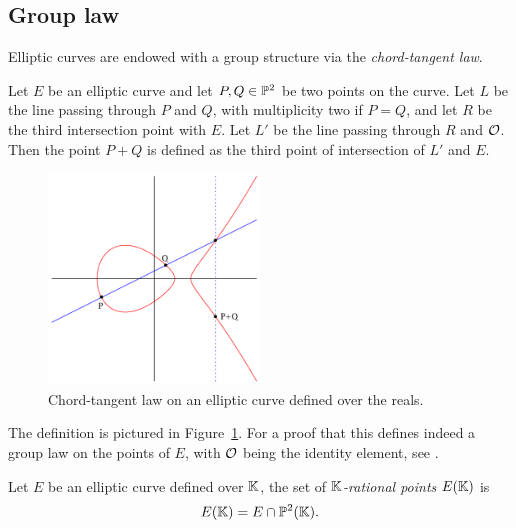 \subsection{Group law}
\label{sec:group-law}
  Elliptic curves are
endowed with a group structure via the
\emph{chord-tangent law}.

\begin{definition}
  Let $E$ be an elliptic curve and let $P,Q\in\mathbb{P}^2$ be two points
  on the curve. Let $L$ be the line passing through $P$ and $Q$, with
  multiplicity two if $P=Q$, and let $R$ be the third intersection
  point with $E$.  Let $L'$ be the line passing through $R$ and
  $\mathcal{O}$. Then the point $P+Q$ is defined as the third point of
  intersection of $L'$ and $E$.
\end{definition}

\begin{figure}[ht]
  \centering
  \includegraphics[width=0.5\textwidth]{isogeny/ec-add}
  \caption{Chord-tangent law on an elliptic curve defined over the reals.}
  \label{fig:chord-tangent}
\end{figure}

The definition is pictured in Figure~\ref{fig:chord-tangent}. For a
proof that this defines indeed a group law on the points of $E$, with
$\mathcal{O}$ being the identity element, see \cite[II, $\S2$]{silverman:elliptic}.

\begin{definition}
  Let $E$ be an elliptic curve defined over $\mathbb{K}$, the set of
  \emph{$\mathbb{K}$-rational points} $E(\mathbb{K})$ is 
  \begin{equation}
    \label{eq:119}
    E(\mathbb{K}) = E \cap \mathbb{P}^2(\mathbb{K})
    \text{.}
  \end{equation}
\end{definition}

